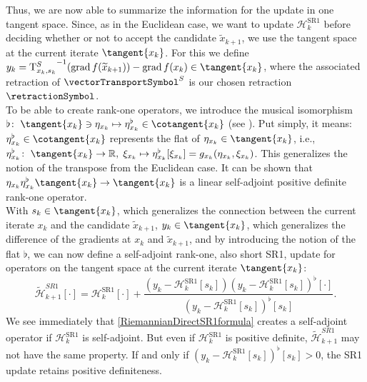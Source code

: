 Thus, we are now able to summarize the information for the update in one tangent space. Since, as in the Euclidean case, we want to update $\mathcal{H}^\mathrm{SR1}_k$ before deciding whether or not to accept the candidate $\widetilde{x}_{k+1}$, we use the tangent space at the current iterate $\tangent{x_k}$. For this we define $y_k = {\mathrm{T}^{S}_{x_k, s_k}}^{-1} ( \operatorname{grad}f(\widetilde{x}_{k+1}) ) - \operatorname{grad}f(x_k) \in \tangent{x_k}$, where the associated retraction of $\vectorTransportSymbol^S$ is our chosen retraction $\retractionSymbol$. \\
To be able to create rank-one operators, we introduce the musical isomorphism $\flat \colon \; \tangent{x_k} \ni \eta_{x_k} \mapsto \eta^{\flat}_{x_k} \in \cotangent{x_k}$ (see \cite[p.~6]{BergmannHerzogLouzeiroSilvaTenbrinckVidalNunez:2020:1}). Put simply, it means: $\eta^{\flat}_{x_k} \in \cotangent{x_k}$ represents the flat of $\eta_{x_k} \in \tangent{x_k}$, i.e., $\eta^{\flat}_{x_k} \colon \; \tangent{x_k} \to \mathbb{R}, \; \xi_{x_k} \mapsto \eta^{\flat}_{x_k}[\xi_{x_k}] = g_{x_k} (\eta_{x_k}, \xi_{x_k})$. This generalizes the notion of the transpose from the Euclidean case. It can be shown that $\eta_{x_k} \eta^{\flat}_{x_k} \tangent{x_k} \to \tangent{x_k}$ is a linear self-adjoint positive definite rank-one operator. \\
With $s_k \in \tangent{x_k}$, which generalizes the connection between the current iterate $x_k$ and the candidate $\widetilde{x}_{k+1}$, $y_k \in \tangent{x_k}$, which generalizes the difference of the gradients at $x_k$ and $\widetilde{x}_{k+1}$, and by introducing the notion of the flat $\flat$, we can now define a self-adjoint rank-one, also short SR1, update for operators on the tangent space at the current iterate $\tangent{x_k}$:
\begin{equation}\label{RiemannianDirectSR1formula}
    \widetilde{\mathcal{H}}^{SR1}_{k+1} [\cdot] = \mathcal{H}^\mathrm{SR1}_k [\cdot] + \frac{(y_k - \mathcal{H}^\mathrm{SR1}_k [s_k]) (y_k - \mathcal{H}^\mathrm{SR1}_k [s_k])^{\flat} [\cdot] }{(y_k - \mathcal{H}^\mathrm{SR1}_k [s_k])^{\flat} [s_k]}.
\end{equation}
We see immediately that \cref{RiemannianDirectSR1formula} creates a self-adjoint operator if $\mathcal{H}^\mathrm{SR1}_k$ is self-adjoint. But even if $\mathcal{H}^\mathrm{SR1}_k$ is positive definite, $\widetilde{\mathcal{H}}^{SR1}_{k+1}$ may not have the same property. If and only if $(y_k - \mathcal{H}^\mathrm{SR1}_k [s_k])^{\flat} [s_k] > 0$, the SR1 update retains positive definiteness. \\
